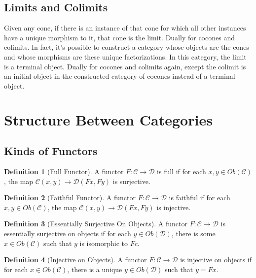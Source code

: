 \documentclass{article}
\theoremstyle{definition}
\newtheorem{definition}{Definition}
\begin{document}
\subsection*{Limits and Colimits}
Given any cone, if there is an instance of that cone for which all other instances have a unique morphism to it, that cone is the limit.
Dually for cocones and colimits.
In fact, it's possible to construct a category whose objects are the cones and whose morphisms are these unique factorizations.
In this category, the limit is a terminal object.
Dually for cocones and colimits again, except the colimit is an initial object in the constructed category of cocones instead of a terminal object.


\section*{Structure Between Categories}

\subsection*{Kinds of Functors}

\begin{definition}[Full Functor]
    A functor $F:\mathcal{C}\rightarrow\mathcal{D}$ is full if for each $x,y\in Ob(\mathcal{C})$, the map $\mathcal{C}(x, y)\rightarrow\mathcal{D}(Fx,Fy)$ is surjective.
\end{definition}

\begin{definition}[Faithful Functor]
    A functor $F:\mathcal{C}\rightarrow\mathcal{D}$ is faithful if for each $x,y\in Ob(\mathcal{C})$, the map $\mathcal{C}(x, y)\rightarrow\mathcal{D}(Fx,Fy)$ is injective.
\end{definition}

\begin{definition}[Essentially Surjective On Objects]
    A functor $F:\mathcal{C}\rightarrow\mathcal{D}$ is essentially surjective on objects if for each $y\in Ob(\mathcal{D})$, there is some $x\in Ob(\mathcal{C})$ such that $y$ is isomorphic to $Fc$.
\end{definition}

\begin{definition}[Injective on Objects]
    A functor $F:\mathcal{C}\rightarrow\mathcal{D}$ is injective on objects if for each $x\in Ob(\mathcal{C})$, there is a unique $y\in Ob(\mathcal{D})$ such that $y=Fx$.
\end{definition}
\end{document}
